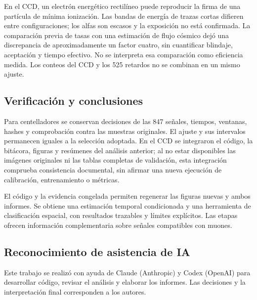 \documentclass[10pt,a4paper]{article}
\begin{document}
En el CCD, un electrón energético rectilíneo puede reproducir la firma de una partícula de mínima ionización. Las bandas de energía de trazas cortas difieren entre configuraciones; los alfas son escasos y la exposición no está confirmada. La comparación previa de tasas con una estimación de flujo cósmico dejó una discrepancia de aproximadamente un factor cuatro, sin cuantificar blindaje, aceptación y tiempo efectivo. No se interpreta esa comparación como eficiencia medida. Los conteos del CCD y los 525 retardos no se combinan en un mismo ajuste.

\subsection{Verificación y conclusiones}
Para centelladores se conservan decisiones de las 847 señales, tiempos, ventanas, hashes y comprobación contra las muestras originales. El ajuste y sus intervalos permanecen iguales a la selección adoptada. En el CCD se integraron el código, la bitácora, figuras y resúmenes del análisis anterior; al no estar disponibles las imágenes originales ni las tablas completas de validación, esta integración comprueba consistencia documental, sin afirmar una nueva ejecución de calibración, entrenamiento o métricas.

El código y la evidencia congelada permiten regenerar las figuras nuevas y ambos informes. Se obtiene una estimación temporal condicionada y una herramienta de clasificación espacial, con resultados trazables y límites explícitos. Las etapas ofrecen información complementaria sobre señales compatibles con muones.

\subsection*{Reconocimiento de asistencia de IA}
Este trabajo se realizó con ayuda de Claude (Anthropic) y Codex (OpenAI) para desarrollar código, revisar el análisis y elaborar los informes. Las decisiones y la interpretación final corresponden a los autores.
\end{document}
